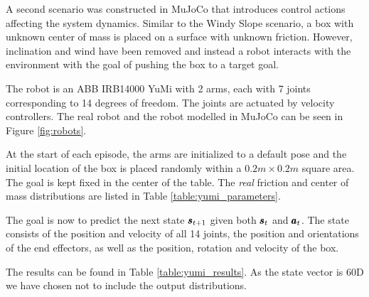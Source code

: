 A second scenario was constructed in MuJoCo that introduces control actions affecting the system dynamics. Similar to the Windy Slope scenario, a box with unknown center of mass is placed on a surface with unknown friction. However, inclination and wind have been removed and instead a robot interacts with the environment with the goal of pushing the box to a target goal.

The robot is an ABB IRB14000 YuMi with 2 arms, each with 7 joints corresponding to 14 degrees of freedom. The joints are actuated by velocity controllers. The real robot and the robot modelled in MuJoCo can be seen in Figure \ref{fig:robots}.

At the start of each episode, the arms are initialized to a default pose and the initial location of the box is placed randomly within a $0.2m \times 0.2m$ square area. The goal is kept fixed in the center of the table. The \emph{real} friction and center of mass distributions are listed in Table \ref{table:yumi_parameters}.

The goal is now to predict the next state $\pmb{s}_{t+1}$ given both $\pmb{s}_t$ and $\pmb{a}_t$. The state consists of the position and velocity of all 14 joints, the position and orientations of the end effectors, as well as the position, rotation and velocity of the box.

The results can be found in Table \ref{table:yumi_results}. As the state vector is 60D we have chosen not to include the output distributions.



